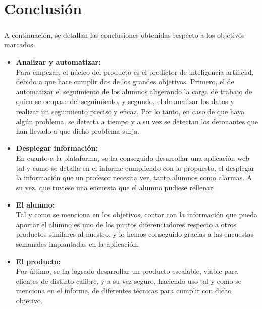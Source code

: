 \chapter{Conclusión}
\paragraph{}
A continuación, se detallan las conclusiones obtenidas respecto a los objetivos marcados.
\begin{itemize}
\item{\textbf{Analizar y automatizar:}}\\
Para empezar, el núcleo del producto es el predictor de inteligencia artificial, debido a que hace cumplir dos de los grandes objetivos. Primero, el de automatizar el seguimiento de los alumnos aligerando la carga de trabajo de quien se ocupase del seguimiento, y segundo, el de analizar los datos y realizar un seguimiento preciso y eficaz. Por lo tanto, en caso de que haya algún problema, se detecta a tiempo y a su vez se detectan los detonantes que han llevado a que dicho problema surja.
\item{\textbf{Desplegar información:}}\\
En cuanto a la plataforma, se ha conseguido desarrollar una aplicación web tal y como se detalla en el informe cumpliendo con lo propuesto, el desplegar la información que un profesor necesita ver, tanto alumnos como alarmas. A su vez, que tuviese una encuesta que el alumno pudiese rellenar.
\item{\textbf{El alumno:}}\\
Tal y como se menciona en los objetivos, contar con la información que pueda aportar el alumno es uno de los puntos diferenciadores respecto a otros productos similares al nuestro, y lo hemos conseguido gracias a las encuestas semanales implantadas en la aplicación.
\item{\textbf{El producto:}}\\
Por último, se ha logrado desarrollar un producto escalable, viable para clientes de distinto calibre, y a su vez seguro, haciendo uso tal y como se menciona en el informe, de diferentes técnicas para cumplir con dicho objetivo.
\end{itemize}